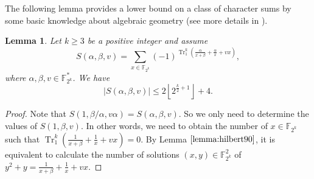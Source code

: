 \documentclass{article}
\newcommand{\F}{\mathbb{F}}
\newcommand{\0}{\textbf{0}}
\newcommand{\1}{\textbf{1}}
\newcommand{\TRACE}{\operatorname{Tr}_1^k}
\theoremstyle{plain}
\newtheorem{lemma}{Lemma}
\begin{document}
The following lemma provides a lower bound on a class of character sums by some basic knowledge about algebraic geometry (see more details in \cite{Stichtenoth2008book_algebraicfunctionfieldsandcodes}).
    \begin{lemma}\label{lemma:charactersums}
        Let $k\ge 3$ be a positive integer and assume
        \[S(\alpha,\beta,v)=\sum_{x\in\F_{2^k}}(-1)^{\TRACE\left( \frac{\alpha}{x+\beta}+\frac{\alpha}{x}+vx \right)},\]
        where $\alpha,\beta,v\in\F_{2^k}^*$.
        We have
        \[\left\lvert S(\alpha,\beta,v)\right\rvert\le 2\left\lfloor 2^{\frac{k}{2}+1}\right\rfloor+4 .\]
    \end{lemma}
    \begin{proof}
        Note that $S(1,\beta/\alpha,v\alpha)=S(\alpha,\beta,v)$.
        So we only need to determine the values of $S(1,\beta,v)$. 
        In other words, we need to obtain the number of $x\in\F_{2^k}$ such that $\TRACE\left( \frac{1}{x+\beta}+\frac{1}{x}+vx \right)=0$.
        By Lemma $\ref{lemma:hilbert90}$, it is equivalent to calculate the number of solutions $(x,y)\in\F_{2^k}^2$ of $y^2+y=\frac{1}{x+\beta}+\frac{1}{x}+vx$.


\end{proof}
\end{document}
